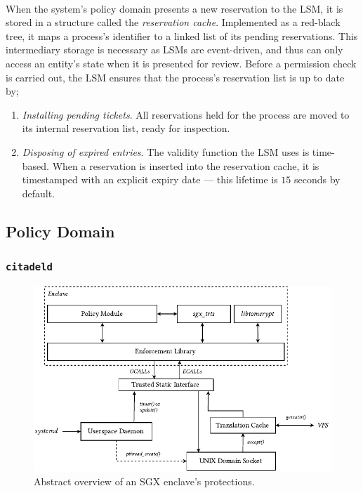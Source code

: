 \paragraph{} When the system's policy domain presents a new reservation to the LSM, it is stored in a structure called the \textit{reservation cache}. Implemented as a red-black tree, it maps a process's identifier to a linked list of its pending reservations. This intermediary storage is necessary as LSMs are event-driven, and thus can only access an entity's state when it is presented for review. Before a permission check is carried out, the LSM ensures that the process's reservation list is up to date by;
\begin{enumerate}
    \item \textit{Installing pending tickets}. All reservations held for the process are moved to its internal reservation list, ready for inspection.
    \item \textit{Disposing of expired entries}. The validity function the LSM uses is time-based. When a reservation is inserted into the reservation cache, it is timestamped with an explicit expiry date --- this lifetime is $15$ seconds by default.  
\end{enumerate}





\subsection{Policy Domain}
\label{sec:policy-domain}

\subsubsection{\texttt{citadeld}}

\begin{figure}[]
    \centering
    \includegraphics[width=\linewidth]{figures/EnclaveLayout.pdf}
    \caption{Abstract overview of an SGX enclave's protections.}
    \label{fig:sgx-basic}
\end{figure}


